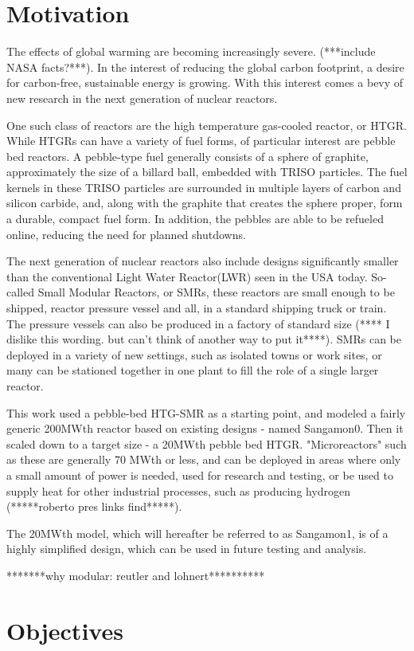 

\section{Motivation}

The effects of global warming are becoming increasingly severe. (***include NASA facts?***).  In the interest of reducing the global carbon footprint, a desire for carbon-free, sustainable energy is growing. With this interest comes a bevy of new research in the next generation of nuclear reactors.

One such class of reactors are the high temperature gas-cooled reactor, or HTGR.  While HTGRs can have a variety of fuel forms, of particular interest are pebble bed reactors.  A pebble-type fuel generally consists of a sphere of graphite, approximately the size of a billard ball, embedded with TRISO particles.  The fuel kernels in these TRISO particles are surrounded in multiple layers of carbon and silicon carbide, and, along with the graphite that creates the sphere proper, form a durable, compact fuel form.  In addition, the pebbles are able to be refueled online, reducing the need for planned shutdowns.

The next generation of nuclear reactors also include designs significantly smaller than the conventional Light Water Reactor(LWR) seen in the USA today.  So-called Small Modular Reactors, or SMRs, these reactors are small enough to be shipped, reactor pressure vessel and all, in a standard shipping truck or train.  The pressure vessels can also be produced in a factory of standard size (**** I dislike this wording. but can't think of another way to put it****).  SMRs can be deployed in a variety of new settings, such as isolated towns or work sites, or many can be stationed together in one plant to fill the role of a single larger reactor.

This work used a pebble-bed HTG-SMR as a starting point, and modeled a fairly generic 200MWth reactor based on existing designs - named Sangamon0. Then it scaled down to a target size - a 20MWth pebble bed HTGR.  "Microreactors" such as these are generally 70 MWth or less, and can be deployed in areas where only a small amount of power is needed, used for research and testing, or be used to supply heat for other industrial processes, such as producing hydrogen (*****roberto pres links find*****).

The 20MWth model, which will hereafter be referred to as Sangamon1, is of a highly simplified design, which can be used in future testing and analysis.

*******why modular: reutler and lohnert**********

\section{Objectives}


